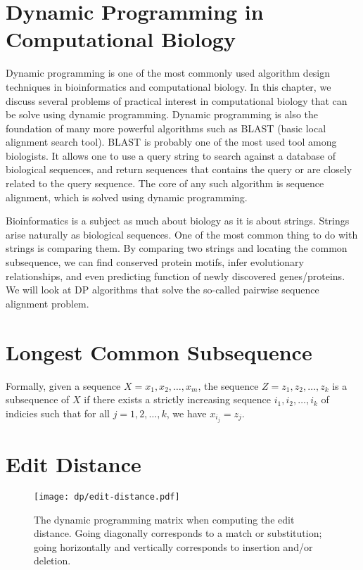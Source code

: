 \section{Dynamic Programming in Computational Biology}

Dynamic programming is one of the most commonly used algorithm design techniques in bioinformatics and computational biology. In this chapter, we discuss several problems of practical interest in computational biology that can be solve using dynamic programming. Dynamic programming is also the foundation of many more powerful algorithms such as BLAST (basic local alignment search tool). BLAST is probably one of the most used tool among biologists. It allows one to use a query string to search against a database of biological sequences, and return sequences that contains the query or are closely related to the query sequence. The core of any such algorithm is sequence alignment, which is solved using dynamic programming.

Bioinformatics is a subject as much about biology as it is about strings. Strings arise naturally as biological sequences. One of the most common thing to do with strings is comparing them. By comparing two strings and locating the common subsequence, we can find conserved protein motifs, infer evolutionary relationships, and even predicting function of newly discovered genes/proteins. We will look at DP algorithms that solve the so-called pairwise sequence alignment problem.

\section{Longest Common Subsequence}

Formally, given a sequence $X = x_1,x_2,\ldots, x_m$, the sequence $Z = z_1,z_2,\ldots,z_k$ is a subsequence of $X$ if there exists a strictly increasing sequence $i_1,i_2,\ldots,i_k$ of indicies such that for all $j = 1,2,\ldots,k$, we have $x_{i_j} = z_{j}$.

\section{Edit Distance}

\begin{figure}[htbp]
    \centering
    \texttt{[image: dp/edit-distance.pdf]}
    \caption{The dynamic programming matrix when computing the edit distance. Going diagonally corresponds to a match or substitution; going horizontally and vertically corresponds to insertion and/or deletion.}
    \label{fig:dp-editdistance-mat}
\end{figure}